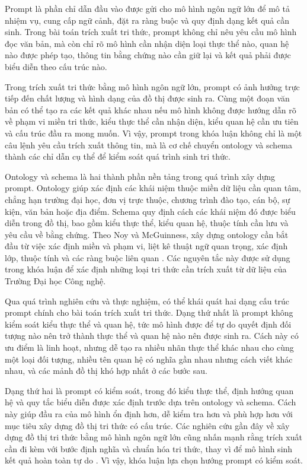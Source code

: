 Prompt là phần chỉ dẫn đầu vào được gửi cho mô hình ngôn ngữ lớn để mô tả nhiệm vụ, cung cấp ngữ cảnh, đặt ra ràng buộc và quy định dạng kết quả cần sinh. Trong bài toán trích xuất tri thức, prompt không chỉ nêu yêu cầu mô hình đọc văn bản, mà còn chỉ rõ mô hình cần nhận diện loại thực thể nào, quan hệ nào được phép tạo, thông tin bằng chứng nào cần giữ lại và kết quả phải được biểu diễn theo cấu trúc nào.

Trong trích xuất tri thức bằng mô hình ngôn ngữ lớn, prompt có ảnh hưởng trực tiếp đến chất lượng và hình dạng của đồ thị được sinh ra. Cùng một đoạn văn bản có thể tạo ra các kết quả khác nhau nếu mô hình không được hướng dẫn rõ về phạm vi miền tri thức, kiểu thực thể cần nhận diện, kiểu quan hệ cần ưu tiên và cấu trúc đầu ra mong muốn. Vì vậy, prompt trong khóa luận không chỉ là một câu lệnh yêu cầu trích xuất thông tin, mà là cơ chế chuyển ontology và schema thành các chỉ dẫn cụ thể để kiểm soát quá trình sinh tri thức.

Ontology và schema là hai thành phần nền tảng trong quá trình xây dựng prompt. Ontology giúp xác định các khái niệm thuộc miền dữ liệu cần quan tâm, chẳng hạn trường đại học, đơn vị trực thuộc, chương trình đào tạo, cán bộ, sự kiện, văn bản hoặc địa điểm. Schema quy định cách các khái niệm đó được biểu diễn trong đồ thị, bao gồm kiểu thực thể, kiểu quan hệ, thuộc tính cần lưu và yêu cầu về bằng chứng. Theo Noy và McGuinness, xây dựng ontology cần bắt đầu từ việc xác định miền và phạm vi, liệt kê thuật ngữ quan trọng, xác định lớp, thuộc tính và các ràng buộc liên quan \cite{noy2001ontology}. Các nguyên tắc này được sử dụng trong khóa luận để xác định những loại tri thức cần trích xuất từ dữ liệu của Trường Đại học Công nghệ.

Qua quá trình nghiên cứu và thực nghiệm, có thể khái quát hai dạng cấu trúc prompt chính cho bài toán trích xuất tri thức. Dạng thứ nhất là prompt không kiểm soát kiểu thực thể và quan hệ, tức mô hình được để tự do quyết định đối tượng nào nên trở thành thực thể và quan hệ nào nên được sinh ra. Cách này có ưu điểm là linh hoạt, nhưng dễ tạo ra nhiều nhãn thực thể khác nhau cho cùng một loại đối tượng, nhiều tên quan hệ có nghĩa gần nhau nhưng cách viết khác nhau, và các mảnh đồ thị khó hợp nhất ở các bước sau.

Dạng thứ hai là prompt có kiểm soát, trong đó kiểu thực thể, định hướng quan hệ và quy tắc biểu diễn được xác định trước dựa trên ontology và schema. Cách này giúp đầu ra của mô hình ổn định hơn, dễ kiểm tra hơn và phù hợp hơn với mục tiêu xây dựng đồ thị tri thức có cấu trúc. Các nghiên cứu gần đây về xây dựng đồ thị tri thức bằng mô hình ngôn ngữ lớn cũng nhấn mạnh rằng trích xuất cần đi kèm với bước định nghĩa và chuẩn hóa tri thức, thay vì để mô hình sinh kết quả hoàn toàn tự do \cite{zhang2024extract}. Vì vậy, khóa luận lựa chọn hướng prompt có kiểm soát.


